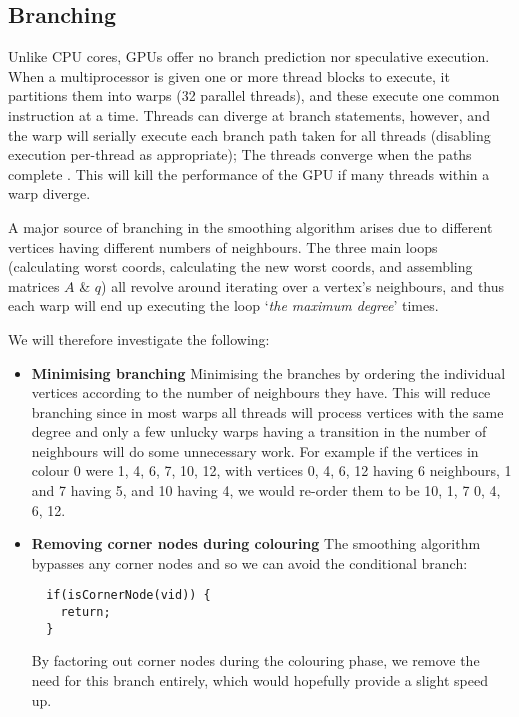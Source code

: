 \subsection{Branching}\label{sec:branching}
Unlike CPU cores, GPUs offer no branch prediction nor speculative execution.
When a multiprocessor is given one or more thread blocks to execute, it partitions them into warps (32 parallel threads), and these execute one common instruction at a time.
Threads can diverge at branch statements, however, and the warp will serially execute each branch path taken for all threads (disabling execution per-thread as appropriate); The threads converge when the paths complete \cite{cuda_guide}. This will kill the performance of the GPU if many threads within a warp diverge.

A major source of branching in the smoothing algorithm arises due to different vertices having different numbers of neighbours. The three main loops (calculating worst coords, calculating the new worst coords, and assembling matrices $A$ \& $q$) all revolve around iterating over a vertex's neighbours, and thus each warp will end up executing the loop `\emph{the maximum degree}' times.

We will therefore investigate the following:
\begin{itemize}
  \item \textbf{Minimising branching}
                Minimising the branches by ordering the individual vertices according to the number of neighbours they have. This will reduce branching since in most warps all threads will process vertices with the same degree and only a few unlucky warps having a transition in the number of neighbours will do some unnecessary work.
                For example if the vertices in colour 0 were 1, 4, 6, 7, 10, 12, with vertices 0, 4, 6, 12 having 6 neighbours, 1 and 7 having 5, and 10 having 4, we would re-order them to be 10, 1, 7 0, 4, 6, 12.

  \item \textbf{Removing corner nodes during colouring}
                The smoothing algorithm bypasses any corner nodes and so we can avoid the conditional branch:
                \begin{verbatim}
  if(isCornerNode(vid)) {
    return;
  }
                \end{verbatim}
                By factoring out corner nodes during the colouring phase, we remove the need for this branch entirely, which would hopefully provide a slight speed up.
\end{itemize}
